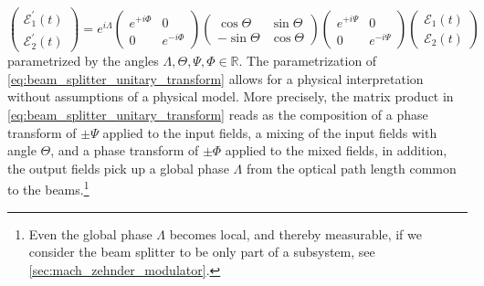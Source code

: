 \begin{equation}
    \begin{pmatrix}
        \mathcal{E}_1^\prime(t)
        \\
        \mathcal{E}_2^\prime(t)
    \end{pmatrix}
    =
    e^{i\Lambda}
    \begin{pmatrix}
        e^{+i\Phi} & 0
        \\
        0 & e^{-i\Phi}
    \end{pmatrix}
    \begin{pmatrix}
        \cos\Theta & \sin\Theta
        \\
        -\sin\Theta & \cos\Theta
    \end{pmatrix}
    \begin{pmatrix}
        e^{+i\Psi} & 0
        \\
        0 & e^{-i\Psi}
    \end{pmatrix}
    \begin{pmatrix}
        \mathcal{E}_1(t)
        \\
        \mathcal{E}_2(t)
    \end{pmatrix}
    \label{eq:beam_splitter_unitary_transform}
\end{equation}
parametrized by the angles $\Lambda,\Theta,\Psi,\Phi\in\mathbb{R}$.
The parametrization of \cref{eq:beam_splitter_unitary_transform} allows for a physical interpretation without assumptions of a physical model.
More precisely, the matrix product in \cref{eq:beam_splitter_unitary_transform} reads as the composition of a phase transform of $\pm\Psi$ applied to the input fields, a mixing of the input fields with angle $\Theta$, and a phase transform of $\pm\Phi$ applied to the mixed fields, in addition, the output fields pick up a global phase $\Lambda$ from the optical path length common to the beams.\footnote{Even the global phase $\Lambda$ becomes local, and thereby measurable, if we consider the beam splitter to be only part of a subsystem, see \cref{sec:mach_zehnder_modulator}.}

